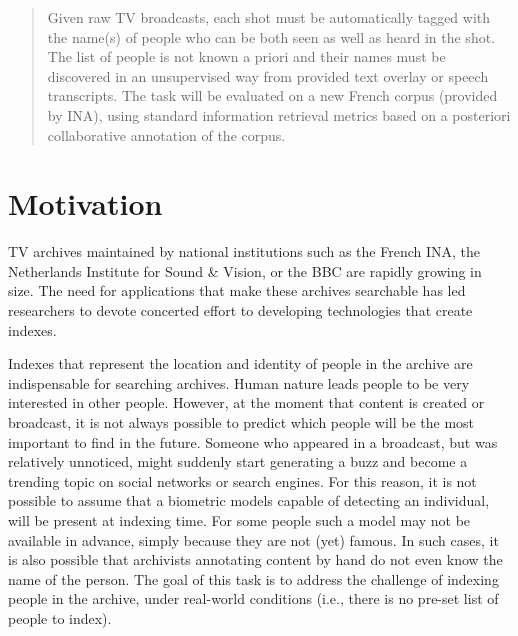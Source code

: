 \documentclass{acm_proc_article-me}
\begin{document}
\maketitle
\begin{abstract}
Given raw TV broadcasts, each shot must be automatically tagged with the name(s) of people who can be both seen as well as heard in the shot. The list of people is not known a priori and their names must be discovered in an unsupervised way from provided text overlay or speech transcripts. The task will be evaluated on a new French corpus (provided by INA), using standard information retrieval metrics based on a posteriori collaborative annotation of the corpus.
\end{abstract}

\section{Motivation}

TV archives maintained by national institutions such as the French INA, the Netherlands Institute for Sound \& Vision, or the BBC are rapidly growing in size. The need for applications that make these archives searchable has led researchers to devote concerted effort to developing technologies that create indexes.

Indexes that represent the location and identity of people in the archive are indispensable for searching archives. Human nature leads people to be very interested in other people. However, at the moment that content is created or broadcast, it is not always possible to predict which people will be the most important to find in the future. Someone who appeared in a broadcast, but was relatively unnoticed, might suddenly start generating a buzz and become a trending topic on social networks or search engines. For this reason, it is not possible to assume that a biometric models capable of detecting an individual, will be present at indexing time. For some people such a model may not be available in advance, simply because they are not (yet) famous. In such cases, it is also possible that archivists annotating content by hand do not even know the name of the person. The goal of this task is to address the challenge of indexing people in the archive, under real-world conditions (i.e., there is no pre-set list of people to index). \\
\end{document}
